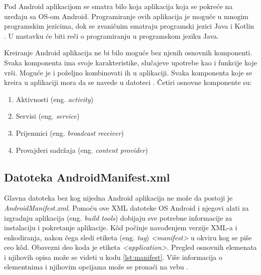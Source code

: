 \documentclass[android.tex]{subfiles}
\begin{document}
Pod Android aplikacijom se smatra bilo koja aplikacija koja se pokreće na uređaju sa OS-om Android. Programiranje ovih aplikacija je moguće u mnogim programskim jezicima, dok se zvaničnim smatraju programski jezici Java i Kotlin \cite{sajt:kotlin}. U nastavku će biti reči o programiranju u programskom jeziku Java.

Kreiranje Android aplikacija ne bi bilo moguće bez njenih osnovnih komponenti. Svaka komponenta ima svoje karakteristike, slučajeve upotrebe kao i funkcije koje vrši. Moguće je i poželjno kombinovati ih u aplikaciji. Svaka komponenta koje se kreira u aplikaciji mora da se navede u datoteci \textit{}. Četiri osnovne komponente su:

\begin{enumerate}
\item Aktivnosti (eng. \textit{activity})
\item Servisi (eng. \textit{service})
\item Prijemnici (eng. \textit{broadcast receiver})
\item Provajderi sadržaja (eng. \textit{content provider})
\end{enumerate}

\subsection{Datoteka AndroidManifest.xml}
\label{sec:manifest}
Glavna datoteka bez kog nijedna Android aplikacija ne može da postoji je \textit{AndroidManifest.xml}. Pomoću ove XML datoteke OS Android i njegovi alati za izgradnju aplikacija (eng. \textit{build tools}) dobijaju sve potrebne informacije za instalaciju i pokretanje aplikacije. K\^{o}d počinje navođenjem verzije XML-a i enkodiranja, nakon čega sledi etiketa (eng. \textit{tag}) \textit{<manifest>} u okviru kog se piše ceo k\^{o}d. Obavezni deo koda je etiketa \textit{<application>}. Pregled osnovnih elemenata i njihovih opisa može se videti u kodu \ref{lst:manifest}. Više informacija o elementnima i njihovim opcijama može se pronaći na vebu \cite{sajt:manifest}.


\end{document}
